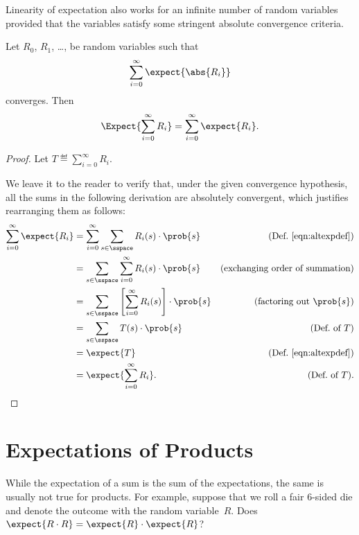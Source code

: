 Linearity of expectation also works for an infinite number of random
variables provided that the variables satisfy some stringent absolute
convergence criteria.

\begin{theorem}\label{linexp}
Let $R_0$, $R_1$, \dots, be random variables such that
\[
\sum_{i = 0}^\infty \expect{\abs{R_i}}
\]
converges.  Then
\[
   \Expect{\sum_{i = 0}^\infty R_i} = \sum_{i = 0}^\infty \expect{R_i}.
\]
\end{theorem}

\begin{proof}
Let $T \eqdef \sum_{i = 0}^\infty R_i$.

We leave it to the reader to verify that, under the given convergence
hypothesis, all the sums in the following derivation are absolutely
convergent, which justifies rearranging them as follows:
\begin{align*}
\sum_{i=0}^\infty \expect{R_i}
    &= \sum_{i=0}^\infty \sum_{s \in \sspace} R_i(s) \cdot \prob{s}
            & \text{(Def.~\ref{eqn:altexpdef})}\\
    &= \sum_{s \in \sspace} \sum_{i=0}^\infty R_i(s) \cdot \prob{s}
           & \text{(exchanging order of summation)}\\
    &= \sum_{s \in \sspace} \left[ \sum_{i=0}^\infty R_i(s) \right] \cdot \prob{s}
                & \text{(factoring out $\prob{s}$)}\\
    &= \sum_{s \in \sspace} T(s) \cdot \prob{s} & \text{(Def.\ of $T$)}\\
    &= \expect{T} & \text{(Def.~\ref{eqn:altexpdef})}\\
    &= \expect{\sum_{i = 0}^\infty R_i}. &  \text{(Def.\ of $T$)}. \qedhere
\end{align*}
\end{proof}

\section{Expectations of Products}

While the expectation of a sum is the sum of the expectations, the same is
usually not true for products.  For example, suppose that we roll a
fair 6-sided die and denote the outcome with the random variable~$R$.
Does $\expect{R \cdot R} = \expect{R} \cdot \expect{R}$?

